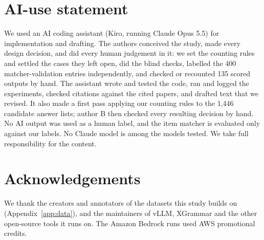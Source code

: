 \section*{AI-use statement}

We used an AI coding assistant (Kiro, running Claude Opus 5.5) for implementation and drafting.
The authors conceived the study, made every design decision, and did every human judgement in it: we set the counting rules and settled the cases they left open, did the blind checks, labelled the 400 matcher-validation entries independently, and checked or recounted 135 scored outputs by hand.
The assistant wrote and tested the code, ran and logged the experiments, checked citations against the cited papers, and drafted text that we revised.
It also made a first pass applying our counting rules to the 1,446 candidate answer lists; author B then checked every resulting decision by hand.
No AI output was used as a human label, and the item matcher is evaluated only against our labels.
No Claude model is among the models tested.
We take full responsibility for the content.

\section*{Acknowledgements}

We thank the creators and annotators of the datasets this study builds on (Appendix~\ref{app:data}), and the maintainers of vLLM, XGrammar and the other open-source tools it runs on.
The Amazon Bedrock runs used AWS promotional credits.
